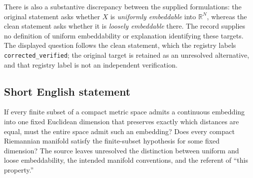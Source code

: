 \documentclass[11pt]{article}
\newcommand{\R}{\mathbb{R}}
\begin{document}
There is also a substantive discrepancy between the supplied formulations: the original statement asks whether \(X\) is \emph{uniformly embeddable} into \(\R^N\), whereas the clean statement asks whether it is \emph{loosely embeddable} there. The record supplies no definition of uniform embeddability or explanation identifying these targets. The displayed question follows the clean statement, which the registry labels \texttt{corrected\_verified}; the original target is retained as an unresolved alternative, and that registry label is not an independent verification.
\subsection{Short English statement}
If every finite subset of a compact metric space admits a continuous embedding into one fixed Euclidean dimension that preserves exactly which distances are equal, must the entire space admit such an embedding? Does every compact Riemannian manifold satisfy the finite-subset hypothesis for some fixed dimension? The source leaves unresolved the distinction between uniform and loose embeddability, the intended manifold conventions, and the referent of ``this property.''
\end{document}
